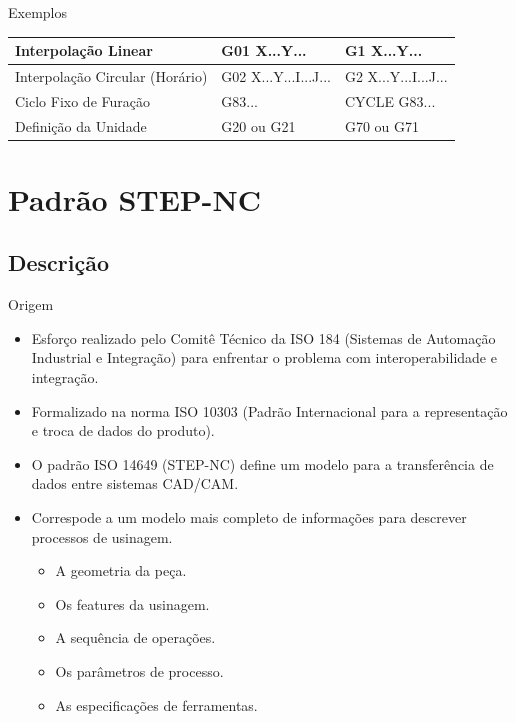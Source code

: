 \documentclass[aspectratio=169]{beamer}
\begin{document}
{\begin{frame}{Exemplos}
\begin{itemize}
{\begin{table}[H]
{\begin{tabular}{p{4.3cm}|p{2.6cm}|p{2.4cm}}
          \hline
          \footnotesize{Interpolação Linear} & 
          \footnotesize{G01 X...Y...} & 
          \footnotesize{G1 X...Y...} \\
      
          \hline
          \footnotesize{Interpolação Circular (Horário)} & 
          \footnotesize{G02 X...Y...I...J...} & 
          \footnotesize{G2 X...Y...I...J...} \\
      
          \hline
          \footnotesize{Ciclo Fixo de Furação} & 
          \footnotesize{G83...} & 
          \footnotesize{CYCLE G83...} \\
      
          \hline
          \footnotesize{Definição da Unidade} & 
          \footnotesize{G20 ou G21 } & 
          \footnotesize{G70 ou G71} \\

          \hline

        \end{tabular}}
      \end{table}
    }    
  \end{itemize}
\end{frame}

\section{Padrão STEP-NC}

\subsection{Descrição}

\begin{frame}{Origem}
  \begin{itemize}
  \item {
    Esforço realizado pelo Comitê Técnico da ISO 184 (Sistemas de Automação Industrial e
    Integração) para enfrentar o problema com interoperabilidade e integração.
  }
  \item {
    Formalizado na norma ISO 10303 (Padrão Internacional para a representação e troca de dados do produto).
  }  
  \item {
    O padrão ISO 14649 (STEP-NC) define um modelo para a transferência de dados entre sistemas CAD/CAM.
  }
  \item {
    Correspode a um modelo mais completo de informações para descrever processos de usinagem.
    \begin{itemize}
      \item A geometria da peça.
      \item Os features da usinagem.
      \item A sequência de operações.
      \item Os parâmetros de processo.
      \item As especificações de ferramentas.
    \end{itemize}
  }
  \end{itemize}
\end{frame}

}
\end{document}
